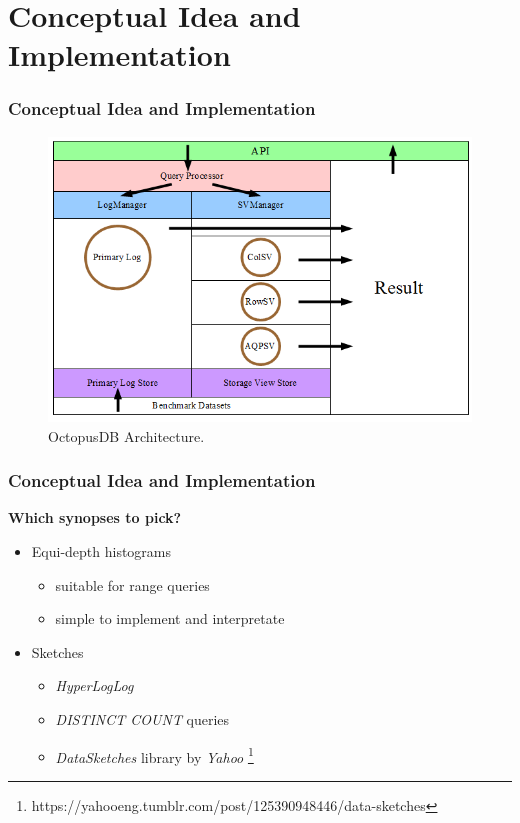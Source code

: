 \documentclass{beamer}
\begin{document}
\section{Conceptual Idea and Implementation}
\begin{frame}
\frametitle{Conceptual Idea and Implementation}
\begin{figure}
\centering
\includegraphics[scale=0.5]{img/blinktopus_architecture.png}
\caption{OctopusDB Architecture.}
\end{figure}
\end{frame}

\begin{frame}
\frametitle{Conceptual Idea and Implementation}
\textbf{Which synopses to pick?}
\begin{itemize}
\item{Equi-depth histograms}
\begin{itemize}
\item{suitable for range queries}
\item{simple to implement and interpretate}
\end{itemize}
\item{Sketches}
\begin{itemize}
\item{\emph{HyperLogLog}}
\item{\textit{DISTINCT COUNT} queries}
\item{\textit{DataSketches} library by \textit{Yahoo} \footnote{https://yahooeng.tumblr.com/post/125390948446/data-sketches}}
\end{itemize}
\end{itemize}
\end{frame}
\end{document}
